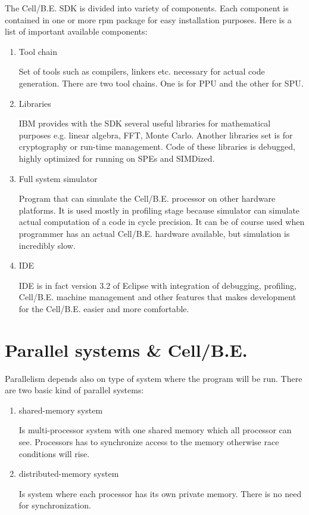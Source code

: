 The \mbox{Cell/B.E.} SDK is divided into variety of components.
Each component is contained in one or more rpm package for easy installation purposes.
Here is a list of important available components:
\begin{enumerate}
  \item {Tool chain}
  \par
  Set of tools such as compilers, linkers etc. necessary for actual code generation.
There are two tool chains.
One is for PPU and the other for SPU.

  \item {Libraries}
  \par
  IBM provides with the SDK several useful libraries for mathematical purposes e.g. linear algebra, FFT, Monte Carlo.
Another libraries set is for cryptography or run-time management.
Code of these libraries is debugged, highly optimized for running on SPEs and SIMDized.

  \item {Full system simulator}
  \par
  Program that can simulate the \mbox{Cell/B.E.} processor on other hardware platforms.
It is used mostly in profiling stage because simulator can simulate actual computation of a code in cycle precision.
It can be of course used when programmer has an actual \mbox{Cell/B.E.} hardware available, but simulation is incredibly slow.

  \item {IDE}
  \par
  IDE is in fact version 3.2 of Eclipse with integration of debugging, profiling, \mbox{Cell/B.E.} machine management and other features that makes development for the \mbox{Cell/B.E.} easier and more comfortable.
\end{enumerate}


\section{Parallel systems \& \mbox{Cell/B.E.}}

Parallelism depends also on type of system where the program will be run.
There are two basic kind of parallel systems:
\begin{enumerate}
\item {shared-memory system}
\par
Is multi-processor system with one shared memory which all processor can see.
Processors has to synchronize access to the memory otherwise race conditions will rise.

\item {distributed-memory system}
\par
Is system where each processor has its own private memory.
There is no need for synchronization.
\end{enumerate}

